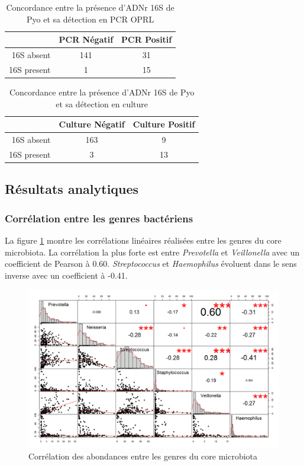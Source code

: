 \documentclass[12pt,a4paper]{article}
\begin{document}
  \begin{table}[!h]
      \centering
      \begin{tabular}{r|c|c}
           & PCR Négatif  & PCR Positif \\
           \hline
           16S absent & 141 & 31 \\
           16S present & 1 & 15   \\

      \end{tabular}
      \caption{Concordance entre la présence d'ADNr 16S de Pyo et sa détection en PCR OPRL}
      \label{pyopcr}
  \end{table}

  \begin{table}[!h]
      \centering
      \begin{tabular}{r|c|c}
           & Culture Négatif  & Culture Positif \\
           \hline
           16S absent & 163 & 9 \\
           16S present & 3 & 13   \\
      \end{tabular}
      \caption{Concordance entre la présence d'ADNr 16S de Pyo et sa détection en culture}
      \label{pyoculture}
  \end{table}


\subsection{Résultats analytiques}
\subsubsection{Corrélation entre les genres bactériens}
La figure \ref{correlation} montre les corrélations linéaires réalisées entre les genres du core microbiota. La corrélation la plus forte est entre \textit{Prevotella} et \textit{Veillonella} avec un coefficient de Pearson à 0.60.  \textit{Streptococcus} et \textit{Haemophilus} évoluent dans le sens inverse avec un coefficient à -0.41.


\begin{figure}
\begin{center}
\includegraphics[scale=0.50]{img/small_correlation.png}\hfill
\end{center}
\caption{Corrélation des abondances entre les genres du core microbiota}
\label{correlation}
\end{figure}
\end{document}
